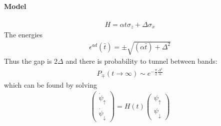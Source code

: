 \paragraph{Model}

\begin{align}
H = \alpha t \sigma_z + \Delta \sigma_x
\end{align}
The energies
\begin{align}
\epsilon^{ad}(\bar{t}) = \pm \sqrt{(\alpha \bar{t}) + \Delta^2}
\end{align}
Thus the gap is $2\Delta$ and there is  probability to tunnel between bands:
\begin{align}
P_{\mp} (t\to \infty) \sim e^{-\frac{\pi}{2} \frac{\Delta^2}{\alpha}}
\end{align}
which can be found by solving
\begin{align}
\begin{pmatrix}
\dot{ \psi}_\uparrow\\
\dot{ \psi}_\downarrow
\end{pmatrix} = H(t)
\begin{pmatrix}
 \psi_\uparrow\\
 \psi_\downarrow
\end{pmatrix}
\end{align}